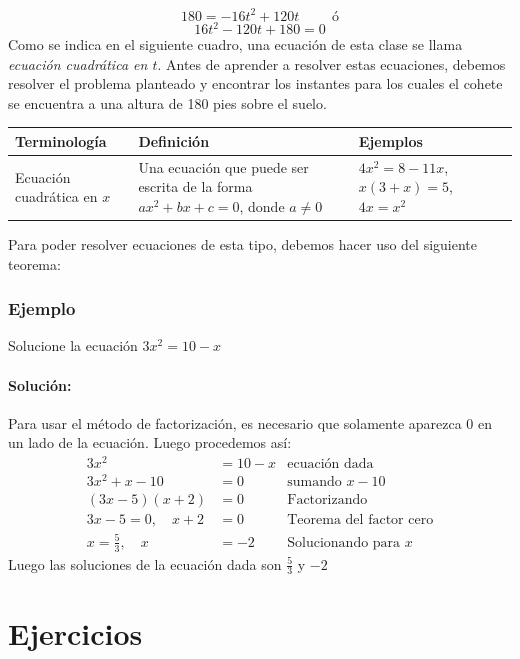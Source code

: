 \documentclass[letterpaper,11pt,twoside]{article}
\begin{document}
 \[180=-16t^{2}+120t \qquad \text{ ó}\]  \[16t^{2}-120t+180=0\]
 Como se indica en el siguiente cuadro, una ecuación de esta clase se llama \emph{ecuación cuadrática en $t$}. Antes de aprender a resolver estas ecuaciones, debemos resolver el problema planteado y encontrar los instantes para los cuales el cohete se encuentra a una altura de 180 pies sobre el suelo.
 \begin{center}
 \begin{tabular}{|p{3.75cm}|p{5.5cm}|p{3cm}l|}
 \hline 
 Terminología & Definición & Ejemplos \\ 
 \hline 
Ecuación cuadrática en $x$ & Una ecuación que puede ser escrita de la forma $ax^{2}+bx+c=0$, donde $a\neq 0$ & $4x^{2}=8-11x$,\; $x(3+x)=5$, \; $4x=x^{2}$ \\ 
 \hline 
 \end{tabular} 
 \end{center}
 Para poder resolver ecuaciones de esta tipo, debemos hacer uso del siguiente teorema:
 
 \subsubsection*{Ejemplo}
 Solucione la ecuación $3x^{2}=10-x$
 \paragraph*{Solución:} Para usar el método de factorización, es necesario que solamente aparezca 0 en un lado de la ecuación. Luego procedemos así:
 \begin{align*}
 3x^{2}&=10-x & \mbox{ecuación dada}\\
 3x^{2}+x-10&=0 & \mbox{sumando } x-10 \\
 (3x-5)(x+2)&=0 & \mbox{Factorizando}\\
 3x-5=0, \quad x+2&=0 & \mbox{Teorema del factor cero}\\
 x=\frac{5}{3},   \quad x&=-2 & \mbox{Solucionando para } x
 \end{align*}
 Luego las soluciones de la ecuación dada son $\frac{5}{3}$ y $-2$
\section*{Ejercicios}
\end{document}
